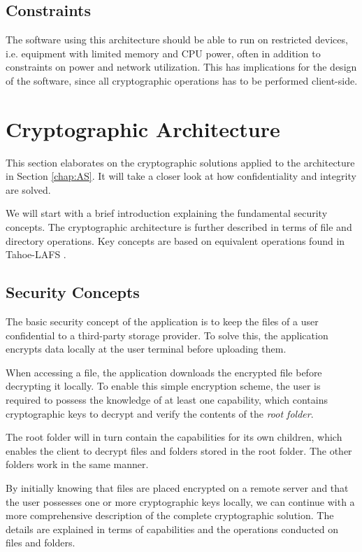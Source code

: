 \documentclass[pdftex,english,10pt,b5paper,twoside]{book}
\begin{document}
\subsection{Constraints}

The software using this architecture should be able to run on restricted
devices, i.e. equipment with limited memory and \ac{CPU} power, often in
addition to constraints on power and network utilization. This has implications
for the design of the software, since all cryptographic operations has to be
performed client-side.

\section{Cryptographic Architecture}
\label{chap:CS}

This section elaborates on the cryptographic solutions applied to the
architecture in Section \ref{chap:AS}. It will take a closer look at
how confidentiality and integrity are solved.

We will start with a brief introduction explaining the fundamental security
concepts. The cryptographic architecture is further described in terms of file
and directory operations.  Key concepts are based on equivalent operations
found in Tahoe-\ac{LAFS} \cite{tahoe}.

\subsection{Security Concepts}

The basic security concept of the application is to keep the files of a user
confidential to a third-party storage provider. To solve this, the application
encrypts data locally at the user terminal before uploading them.

When accessing a file, the application downloads the encrypted file before
decrypting it locally. To enable this simple encryption scheme, the user is
required to possess the knowledge of at least one capability, which contains
cryptographic keys to decrypt and verify the contents of the \emph{root
folder}.

The root folder will in turn contain the capabilities for its own children,
which enables the client to decrypt files and folders stored in the root
folder. The other folders work in the same manner.

By initially knowing that files are placed encrypted on a remote server and
that the user possesses one or more cryptographic keys locally, we can continue
with a more comprehensive description of the complete cryptographic solution.
The details are explained in terms of capabilities and the operations conducted
on files and folders.
\end{document}
